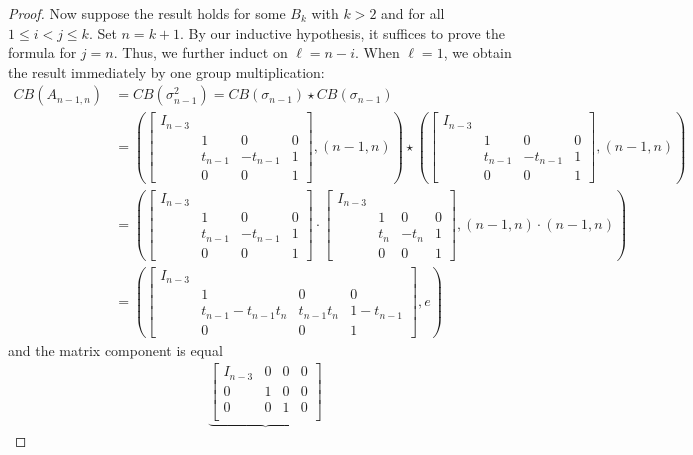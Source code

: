 \documentclass[11pt]{article}
\begin{document}
\begin{proof}
	Now suppose the result holds for some $B_k$ with $k>2$ and for all 
	$1\leq i<j \leq k$. Set $n=k+1$. By our inductive hypothesis, it suffices to prove 
	the formula for $j=n$. Thus, we further induct on $\ell=n-i$. When $\ell=1$, we 
	obtain the result immediately by one group multiplication:
	\begin{align*}
		CB(A_{n-1,n})&=CB(\sigma_{n-1}^2)=CB(\sigma_{n-1})\star CB(\sigma_{n-1})\\
		&=
		\left(
		\begin{bmatrix}
			I_{n-3}&\\
			& 1 & 0 & 0\\
			& t_{n-1} & -t_{n-1} & 1\\
			& 0& 0& 1
		\end{bmatrix},(n-1,n)
		\right)
		\star
		\left(
		\begin{bmatrix}
			I_{n-3}&\\
			& 1 & 0 &0\\
			& t_{n-1} & -t_{n-1}&1\\
			& 0& 0& 1
		\end{bmatrix},(n-1,n)
		\right)\\
		&=
		\left(
		\begin{bmatrix}
			I_{n-3}&\\
			& 1 & 0&0\\
			& t_{n-1} & -t_{n-1}&1\\
			& 0& 0& 1
		\end{bmatrix}
		\cdot
		\begin{bmatrix}
			I_{n-3}&\\
			& 1 & 0&0\\
			& t_n & -t_n&1\\
			& 0& 0& 1
		\end{bmatrix},(n-1,n)\cdot(n-1,n)
		\right)\\
		&=
		\left(
		\begin{bmatrix}
			I_{n-3}&\\
			& 1 & 0&0\\
			& t_{n-1}-t_{n-1}t_n & t_{n-1}t_n&1-t_{n-1}\\
			& 0& 0& 1
		\end{bmatrix}, e
		\right)
	\end{align*}
	and the matrix component is equal
	\begin{align*}
		&\underbrace{\begin{bmatrix}
				I_{n-3} & 0 & 0 & 0\\
				0 & 1 & 0 & 0 \\
				0 & 0 & 1 & 0 \\

\end{bmatrix}}
\end{align*}
\end{proof}
\end{document}

